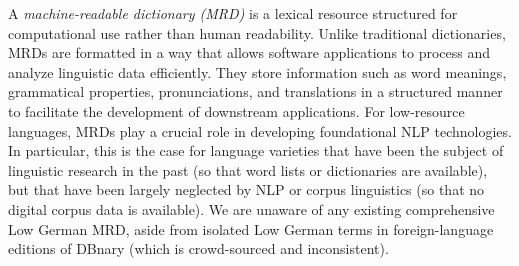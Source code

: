 A \emph{machine-readable dictionary (MRD)} is a lexical resource structured for computational use rather than human readability. Unlike traditional dictionaries, MRDs are formatted in a way that allows software applications to process and analyze linguistic data efficiently. They store information such as word meanings, grammatical properties, pronunciations, and translations in a structured manner to facilitate the development of downstream applications. For low-resource languages, MRDs play a crucial role in developing foundational NLP technologies. In particular, this is the case for language varieties that have been the subject of linguistic research in the past (so that word lists or dictionaries are available), but that have been largely neglected by NLP or corpus linguistics (so that no digital corpus data is available). 
We are unaware of any existing comprehensive Low German MRD, aside from isolated Low German terms in foreign-language editions of DBnary \cite{serasset2014dbnary} (which is crowd-sourced and inconsistent). 
